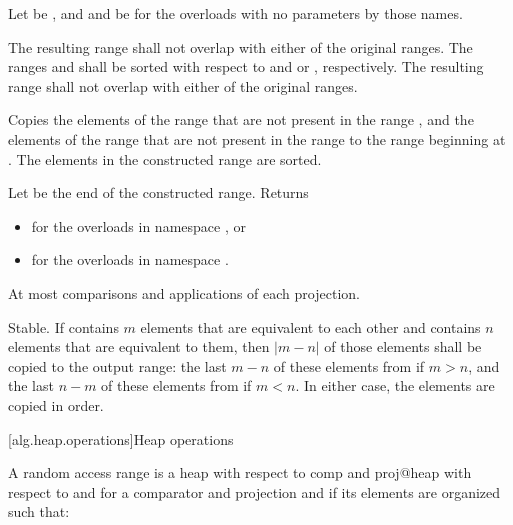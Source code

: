 \begin{itemdescr}
\pnum
Let  be ,
and  and  be 
for the overloads with no parameters by those names.

\pnum
\requires
The resulting range shall not overlap with either of the original ranges.
The ranges  and  shall be
sorted with respect to  and
 or , respectively.
The resulting range shall not overlap with either of the original ranges.

\pnum
\effects
Copies the elements of the range
that are not present in the range
,
and the elements of the range
that are not present in the range
to the range beginning at
.
The elements in the constructed range are sorted.

\pnum
\returns
Let  be the end of the constructed range.
Returns
\begin{itemize}
\item {} for the overloads in namespace , or
\item {} for the overloads in
  namespace .
\end{itemize}

\pnum
\complexity
At most
comparisons and applications of each projection.

\pnum
\remarks
Stable.
If  contains $m$ elements that are equivalent to each other and
 contains $n$ elements that are equivalent to them, then
$|m - n|$ of those elements shall be copied to the output range: the last
$m - n$ of these elements from  if $m > n$, and the last
$n - m$ of these elements from  if $m < n$.
In either case, the elements are copied in order.
\end{itemdescr}

[alg.heap.operations]{Heap operations}

\pnum
A random access range  is a
{heap with respect to comp and proj@heap with respect to  and }
for a comparator and projection  and 
if its elements are organized such that:

